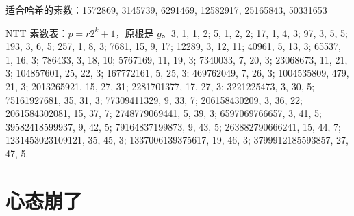 \documentclass[9pt]{ctexart}
\begin{document}
\begin{multicols}{2}
  适合哈希的素数：1572869, 3145739, 6291469, 12582917, 25165843, 50331653

  NTT 素数表：$p= r2^k+1$，原根是 $g$。3, 1, 1, 2; 5, 1, 2, 2; 17, 1, 4, 3; 97, 3, 5, 5; 193, 3, 6, 5; 257, 1, 8, 3; 7681, 15, 9, 17; 12289, 3, 12, 11; 40961, 5, 13, 3; 65537, 1, 16, 3; 786433, 3, 18, 10; 5767169, 11, 19, 3; 7340033, 7, 20, 3; 23068673, 11, 21, 3; 104857601, 25, 22, 3; 167772161, 5, 25, 3; 469762049, 7, 26, 3; 1004535809, 479, 21, 3; 2013265921, 15, 27, 31; 2281701377, 17, 27, 3; 3221225473, 3, 30, 5; 75161927681, 35, 31, 3; 77309411329, 9, 33, 7; 206158430209, 3, 36, 22; 2061584302081, 15, 37, 7; 2748779069441, 5, 39, 3; 6597069766657, 3, 41, 5; 39582418599937, 9, 42, 5; 79164837199873, 9, 43, 5; 263882790666241, 15, 44, 7; 1231453023109121, 35, 45, 3; 1337006139375617, 19, 46, 3; 3799912185593857, 27, 47, 5.

  \section{心态崩了}


\end{multicols}
\end{document}
